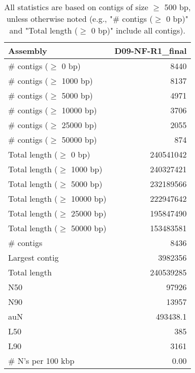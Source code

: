\documentclass[12pt,a4paper]{article}
\begin{document}
\begin{table}[ht]
\begin{center}
\caption{All statistics are based on contigs of size $\geq$ 500 bp, unless otherwise noted (e.g., "\# contigs ($\geq$ 0 bp)" and "Total length ($\geq$ 0 bp)" include all contigs).}
\begin{tabular}{|l*{1}{|r}|}
\hline
Assembly & D09-NF-R1\_final \\ \hline
\# contigs ($\geq$ 0 bp) & 8440 \\ \hline
\# contigs ($\geq$ 1000 bp) & 8137 \\ \hline
\# contigs ($\geq$ 5000 bp) & 4971 \\ \hline
\# contigs ($\geq$ 10000 bp) & 3706 \\ \hline
\# contigs ($\geq$ 25000 bp) & 2055 \\ \hline
\# contigs ($\geq$ 50000 bp) & 874 \\ \hline
Total length ($\geq$ 0 bp) & 240541042 \\ \hline
Total length ($\geq$ 1000 bp) & 240327421 \\ \hline
Total length ($\geq$ 5000 bp) & 232189566 \\ \hline
Total length ($\geq$ 10000 bp) & 222947642 \\ \hline
Total length ($\geq$ 25000 bp) & 195847490 \\ \hline
Total length ($\geq$ 50000 bp) & 153483581 \\ \hline
\# contigs & 8436 \\ \hline
Largest contig & 3982356 \\ \hline
Total length & 240539285 \\ \hline
N50 & 97926 \\ \hline
N90 & 13957 \\ \hline
auN & 493438.1 \\ \hline
L50 & 385 \\ \hline
L90 & 3161 \\ \hline
\# N's per 100 kbp & 0.00 \\ \hline
\end{tabular}
\end{center}
\end{table}
\end{document}

